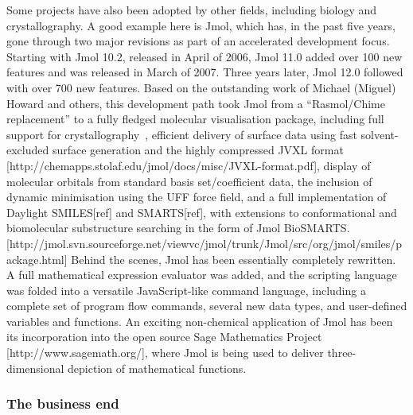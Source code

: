 \documentclass[10pt]{bmc_article}
\newenvironment{bmcformat}{\begin{raggedright}\baselineskip20pt\sloppy\setboolean{publ}{false}}{\end{raggedright}\baselineskip20pt\sloppy}
\begin{document}
\begin{bmcformat}
Some projects have also been adopted by other fields, including biology
and crystallography. A good example
here is Jmol, which has, in the past five years, gone through two major revisions
as part of an accelerated development focus. Starting with Jmol 10.2, released in
April of 2006, Jmol 11.0 added over 100 new features and was released in March of
2007. Three years later, Jmol 12.0 followed with over 700 new features.
Based on the outstanding work of Michael (Miguel) Howard and others, this development
path took Jmol from a ``Rasmol/Chime replacement'' to a fully fledged molecular
visualisation package, including full support for crystallography~\cite{Hanson2010},
efficient delivery of surface data using fast solvent-excluded surface
generation and the highly compressed JVXL format [http://chemapps.stolaf.edu/jmol/docs/misc/JVXL-format.pdf],
 display of molecular orbitals from standard basis set/coefficient data,
the inclusion of dynamic minimisation using the UFF force field, and
a full implementation of Daylight SMILES[ref] and SMARTS[ref], with extensions to
conformational and biomolecular substructure searching in the form of Jmol
BioSMARTS.[http://jmol.svn.sourceforge.net/viewvc/jmol/trunk/Jmol/src/org/jmol/smiles/package.html]
Behind the scenes, Jmol has been essentially completely rewritten. A full
mathematical expression evaluator was added, and the scripting language
was folded into a versatile JavaScript-like command language, including a
complete set of program flow commands, several new data types, and
user-defined variables and functions. An exciting non-chemical application
of Jmol has been its incorporation into the open source Sage
Mathematics Project [http://www.sagemath.org/], where Jmol is being used
to deliver three-dimensional depiction of mathematical functions.


\subsubsection*{The business end}



\end{bmcformat}
\end{document}
